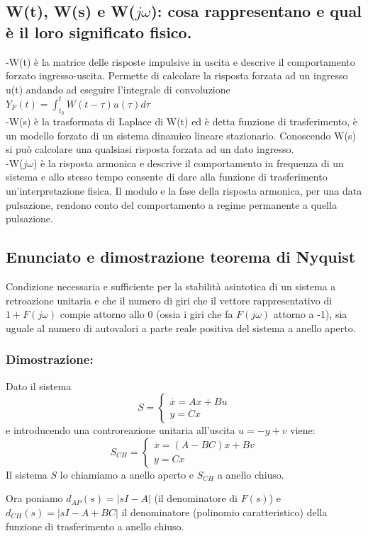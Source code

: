 \documentclass{article}
\begin{document}
\subsection{W(t), W(s) e W($j\omega$): cosa rappresentano e qual è il loro significato fisico.}
-W(t) è la matrice delle risposte impulsive in uscita e descrive il comportamento forzato ingresso-uscita. Permette di calcolare la risposta forzata ad un ingresso u(t) andando ad eseguire l'integrale di convoluzione $Y_F(t)=\int_{t_0}^{t} W(t-\tau)u(\tau)d\tau $\\
-W(s) è la trasformata di Laplace di W(t) ed è detta funzione di trasferimento, è un modello forzato di un sistema dinamico lineare stazionario. Conoscendo W(s) si può calcolare una qualsiasi risposta forzata ad un dato ingresso.\\
-W($j\omega$) è la risposta armonica e descrive il comportamento in  frequenza di un sistema e allo stesso tempo consente di dare alla funzione di trasferimento un'interpretazione fisica. Il modulo e la fase della risposta armonica, per una data pulsazione, rendono conto del comportamento a regime permanente a quella pulsazione.

\subsection{Enunciato e dimostrazione teorema di Nyquist}
Condizione necessaria e sufficiente per la stabilità asintotica di un sistema a retroazione unitaria e che il numero di 
giri che il vettore rappresentativo di $1+F(j\omega)$ compie attorno allo 0 (ossia i giri che fa $F(j\omega)$ attorno a -1),
sia uguale al numero di autovalori a parte reale positiva del sistema a anello aperto.

\subsubsection{Dimostrazione:}
Dato il sistema 
\[S = \begin{cases} \overset{\cdot}{x} = Ax+Bu\\ y = Cx \end{cases}\]
e introducendo una controreazione unitaria all'uscita $u = -y +v$ viene:
\[S_{CH} = \begin{cases} \overset{\cdot}{x} = (A-BC)x+Bv\\ y = Cx \end{cases}\]
Il sistema $S$ lo chiamiamo a anello aperto e $S_{CH}$ a anello chiuso.

Ora poniamo $d_{AP}(s) = |sI-A|$ (il denominatore di $F(s)$) e $d_{CH}(s) = |sI-A+BC|$ il denominatore
(polinomio caratteristico)
della funzione di trasferimento a anello chiuso.
\end{document}
